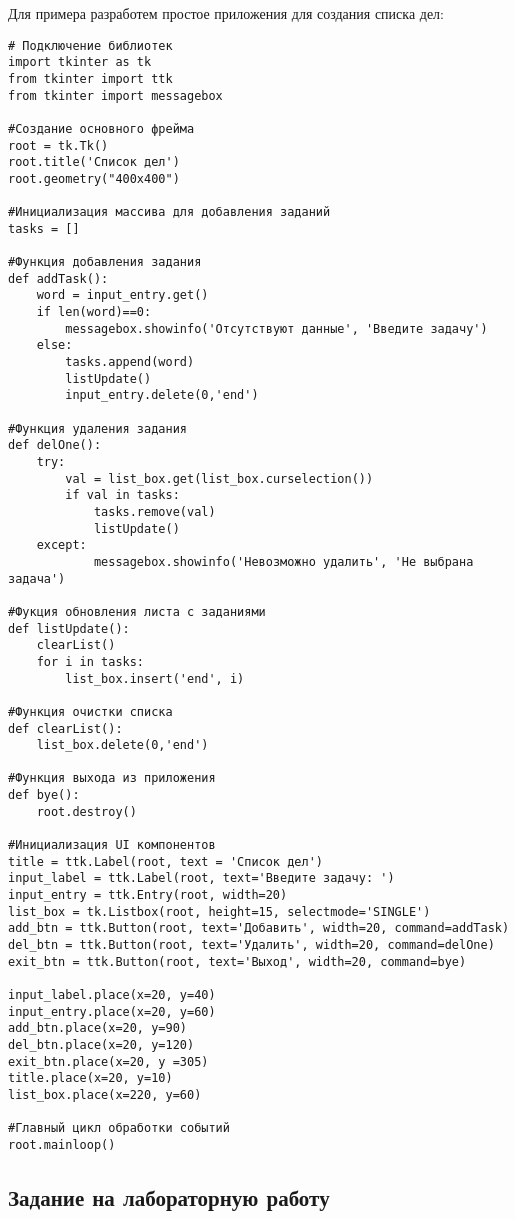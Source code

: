 \documentclass[a4paper]{article}
\begin{document}
Для примера разработем простое приложения для создания списка дел:

\begin{lstlisting}[label=todo, caption=Список дел]
# Подключение библиотек
import tkinter as tk
from tkinter import ttk
from tkinter import messagebox

#Создание основного фрейма
root = tk.Tk()
root.title('Список дел')
root.geometry("400x400")

#Инициализация массива для добавления заданий
tasks = []

#Функция добавления задания
def addTask():
    word = input_entry.get()
    if len(word)==0:
        messagebox.showinfo('Отсутствуют данные', 'Введите задачу')
    else:
        tasks.append(word)
        listUpdate()
        input_entry.delete(0,'end')

#Функция удаления задания
def delOne():
    try:
        val = list_box.get(list_box.curselection())
        if val in tasks:
            tasks.remove(val)
            listUpdate()
    except:
            messagebox.showinfo('Невозможно удалить', 'Не выбрана задача')

#Фукция обновления листа с заданиями
def listUpdate():
    clearList()
    for i in tasks:
        list_box.insert('end', i)

#Функция очистки списка
def clearList():
    list_box.delete(0,'end')

#Функция выхода из приложения
def bye():
    root.destroy()

#Инициализация UI компонентов
title = ttk.Label(root, text = 'Список дел')
input_label = ttk.Label(root, text='Введите задачу: ')
input_entry = ttk.Entry(root, width=20)
list_box = tk.Listbox(root, height=15, selectmode='SINGLE')
add_btn = ttk.Button(root, text='Добавить', width=20, command=addTask)
del_btn = ttk.Button(root, text='Удалить', width=20, command=delOne)
exit_btn = ttk.Button(root, text='Выход', width=20, command=bye)

input_label.place(x=20, y=40)
input_entry.place(x=20, y=60)
add_btn.place(x=20, y=90)
del_btn.place(x=20, y=120)
exit_btn.place(x=20, y =305)
title.place(x=20, y=10)
list_box.place(x=220, y=60)

#Главный цикл обработки событий
root.mainloop()
\end{lstlisting}

\newpage
\subsection{Задание на лабораторную работу}
\end{document}
